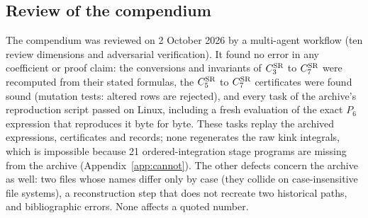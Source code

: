 \documentclass[11pt,a4paper]{article}
\numberwithin{equation}{section}
\newcommand{\CSR}{C^{\rm SR}}
\begin{document}
\subsection{Review of the compendium}\label{sec:review1}
The compendium was reviewed on 2 October 2026 by a multi-agent workflow (ten review dimensions and adversarial
verification). It found no error in any coefficient or proof claim: the conversions and invariants of $\CSR_3$ to
$\CSR_7$ were recomputed from their stated formulas, the $\CSR_5$ to $\CSR_7$ certificates were found sound (mutation
tests: altered rows are rejected), and every task of the archive's reproduction script passed on Linux, including a
fresh evaluation of the exact $P_6$ expression that reproduces it byte for byte. These tasks replay the archived
expressions, certificates and records; none regenerates the raw kink integrals, which is impossible because 21
ordered-integration stage programs are missing from the archive (Appendix~\ref{app:cannot}). The other defects concern
the archive as well: two files whose names differ only by case (they collide on case-insensitive file systems), a
reconstruction step that does not recreate two historical paths, and bibliographic errors. None affects a quoted
number.
\end{document}
